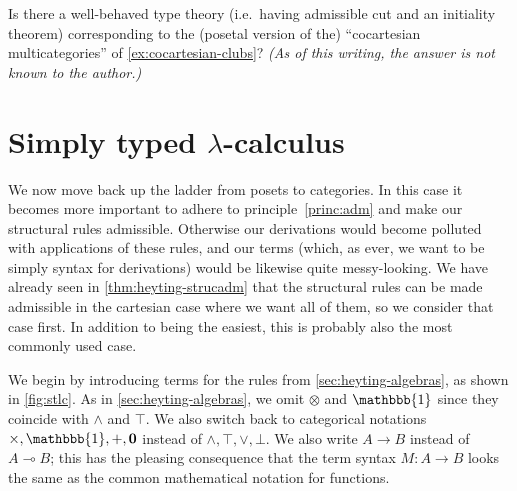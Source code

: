 \documentclass{book}
\let\meet\wedge
\let\join\vee
\def\unit{\mathbbb{1}}%
\def\zero{\mathbf{0}}
\let\tensor\otimes
\let\hom\multimap
\begin{document}
\begin{ex}\label{ex:cocartesian-typetheory}
  Is there a well-behaved type theory (i.e.\ having admissible cut and an initiality theorem) corresponding to the (posetal version of the) ``cocartesian multicategories'' of \cref{ex:cocartesian-clubs}?
  \textit{(As of this writing, the answer is not known to the author.)}
\end{ex}



\section{Simply typed $\lambda$-calculus}
\label{sec:stlc}
\label{sec:cartmoncat}

We now move back up the ladder from posets to categories.
In this case it becomes more important to adhere to principle~\eqref{princ:adm} and make our structural rules admissible.
Otherwise our derivations would become polluted with applications of these rules, and our terms (which, as ever, we want to be simply syntax for derivations) would be likewise quite messy-looking.
We have already seen in \cref{thm:heyting-strucadm} that the structural rules can be made admissible in the cartesian case where we want all of them, so we consider that case first.
In addition to being the easiest, this is probably also the most commonly used case.

We begin by introducing terms for the rules from \cref{sec:heyting-algebras}, as shown in \cref{fig:stlc}.
As in \cref{sec:heyting-algebras}, we omit $\tensor$ and $\unit$ since they coincide with $\meet$ and $\top$.
We also switch back to categorical notations $\times,\unit,+,\zero$ instead of $\meet,\top,\join,\bot$.
We also write $A\to B$ instead of $A\hom B$; this has the pleasing consequence that the term syntax $M:A\to B$ looks the same as the common mathematical notation for functions.
\end{document}
